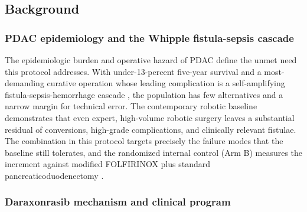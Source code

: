 \vspace{-0.65cm}

\subsection{Background}

\subsubsection*{PDAC epidemiology and the Whipple fistula-sepsis cascade}

The epidemiologic burden and operative hazard of PDAC define the unmet need this
protocol addresses. With under-13-percent five-year survival \cite{Siegel2025}
and a most-demanding curative operation whose leading complication is a
self-amplifying fistula-sepsis-hemorrhage cascade \cite{Bassi2017}, the
population has few alternatives and a narrow margin for technical error. The
contemporary robotic baseline \cite{DutchCohort2025} demonstrates that even
expert, high-volume robotic surgery leaves a substantial residual of conversions,
high-grade complications, and clinically relevant fistulae. The combination in
this protocol targets precisely the failure modes that the baseline still
tolerates, and the randomized internal control (Arm B) measures the increment
against modified FOLFIRINOX plus standard pancreaticoduodenectomy
\cite{Conroy2018}.

\subsubsection*{Daraxonrasib mechanism and clinical program}

